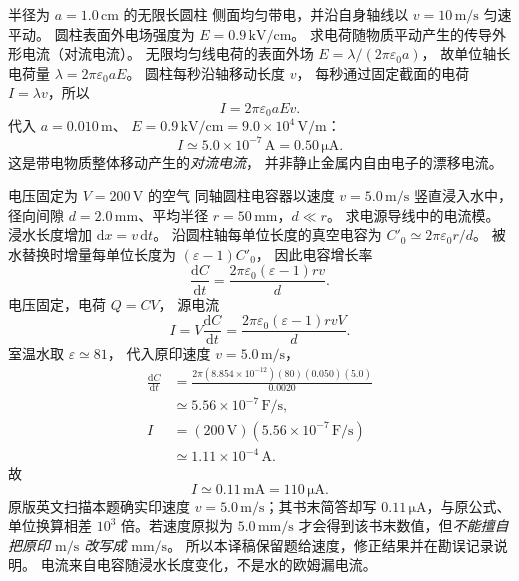 
半径为 $a=1.0\,\mathrm{cm}$ 的无限长圆柱
侧面均匀带电，并沿自身轴线以
$v=10\,\mathrm{m/s}$ 匀速平动。
圆柱表面外电场强度为
$E=0.9\,\mathrm{kV/cm}$。
求电荷随物质平动产生的传导外形电流（对流电流）。
\exsolution
无限均匀线电荷的表面外场
$E=\lambda/(2\pi\varepsilon_0a)$，
故单位轴长电荷量
$\lambda=2\pi\varepsilon_0aE$。
圆柱每秒沿轴移动长度 $v$，
每秒通过固定截面的电荷
$I=\lambda v$，所以
\[
\boxed{I=2\pi\varepsilon_0aEv}.
\]
代入 $a=0.010\,\mathrm m$、
$E=0.9\,\mathrm{kV/cm}
=9.0\times10^4\,\mathrm{V/m}$：
\[
\boxed{I\simeq5.0\times10^{-7}\,\mathrm A
=0.50\,\mathrm{\mu A}}.
\]
\excheck 这是带电物质整体移动产生的\emph{对流电流}，
并非静止金属内自由电子的漂移电流。

电压固定为 $V=200\,\mathrm V$ 的空气
同轴圆柱电容器以速度 $v=5.0\,\mathrm{m/s}$
竖直浸入水中，径向间隙
$d=2.0\,\mathrm{mm}$、平均半径
$r=50\,\mathrm{mm}$，$d\ll r$。
求电源导线中的电流模。
\exsolution
浸水长度增加 $\mathrm dx=v\,\mathrm dt$。
沿圆柱轴每单位长度的真空电容为
$C'_0\simeq2\pi\varepsilon_0r/d$。
被水替换时增量每单位长度为
$(\varepsilon-1)C'_0$，
因此电容增长率
\[
\frac{\mathrm dC}{\mathrm dt}
=\frac{2\pi\varepsilon_0(\varepsilon-1)rv}{d}.
\]
电压固定，电荷 $Q=CV$，
源电流
\[
\boxed{I=V\frac{\mathrm dC}{\mathrm dt}
=\frac{2\pi\varepsilon_0(\varepsilon-1)rvV}{d}}.
\]
室温水取 $\varepsilon\simeq81$，
代入原印速度 $v=5.0\,\mathrm{m/s}$，
\[
\begin{aligned}
\frac{\mathrm dC}{\mathrm dt}
&=\frac{2\pi(8.854\times10^{-12})(80)
(0.050)(5.0)}{0.0020}
\\
&\simeq5.56\times10^{-7}\,\mathrm{F/s},
\\
I&=(200\,\mathrm V)(5.56\times10^{-7}\,\mathrm{F/s})
\\
&\simeq1.11\times10^{-4}\,\mathrm A.
\end{aligned}
\]
故
\[
\boxed{I\simeq0.11\,\mathrm{mA}
=110\,\mathrm{\mu A}}.
\]
\excheck 原版英文扫描本题确实印速度
$v=5.0\,\mathrm{m/s}$；其书末简答却写
$0.11\,\mathrm{\mu A}$，与原公式、单位换算相差
$10^3$ 倍。若速度原拟为 $5.0\,\mathrm{mm/s}$
才会得到该书末数值，但\emph{不能擅自把原印
$\mathrm{m/s}$ 改写成 $\mathrm{mm/s}$}。
所以本译稿保留题给速度，修正结果并在勘误记录说明。
电流来自电容随浸水长度变化，不是水的欧姆漏电流。


